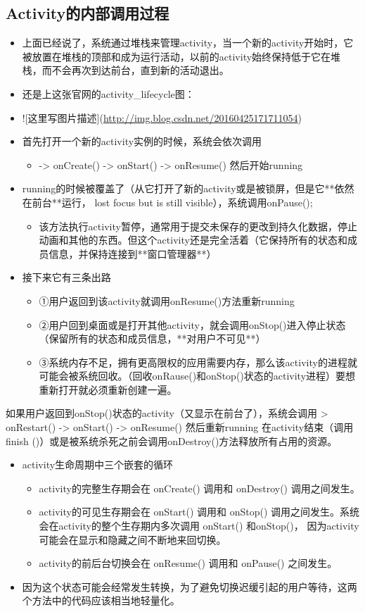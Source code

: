 \documentclass[9pt, b5paper]{article}
\begin{document}
\subsection{Activity的内部调用过程}
\label{sec-1-2}
\begin{itemize}
\item 上面已经说了，系统通过堆栈来管理activity，当一个新的activity开始时，它被放置在堆栈的顶部和成为运行活动，以前的activity始终保持低于它在堆栈，而不会再次到达前台，直到新的活动退出。
\item 还是上这张官网的activity\_lifecycle图：
\item ![这里写图片描述](\url{http://img.blog.csdn.net/20160425171711054})　
\item 首先打开一个新的activity实例的时候，系统会依次调用
\begin{itemize}
\item -> onCreate()  -> onStart() -> onResume() 然后开始running
\end{itemize}
\item running的时候被覆盖了（从它打开了新的activity或是被锁屏，但是它**依然在前台**运行， lost focus but is still visible），系统调用onPause();
\begin{itemize}
\item 该方法执行activity暂停，通常用于提交未保存的更改到持久化数据，停止动画和其他的东西。但这个activity还是完全活着（它保持所有的状态和成员信息，并保持连接到**窗口管理器**）
\end{itemize}
\item 接下来它有三条出路
\begin{itemize}
\item ①用户返回到该activity就调用onResume()方法重新running
\item ②用户回到桌面或是打开其他activity，就会调用onStop()进入停止状态（保留所有的状态和成员信息，**对用户不可见**）
\item ③系统内存不足，拥有更高限权的应用需要内存，那么该activity的进程就可能会被系统回收。（回收onRause()和onStop()状态的activity进程）要想重新打开就必须重新创建一遍。
\end{itemize}
\end{itemize}
如果用户返回到onStop()状态的activity（又显示在前台了），系统会调用
> onRestart() ->  onStart() -> onResume() 然后重新running
在activity结束（调用finish ()）或是被系统杀死之前会调用onDestroy()方法释放所有占用的资源。

\begin{itemize}
\item activity生命周期中三个嵌套的循环
\begin{itemize}
\item activity的完整生存期会在 onCreate() 调用和 onDestroy() 调用之间发生。　
\item activity的可见生存期会在 onStart() 调用和 onStop() 调用之间发生。系统会在activity的整个生存期内多次调用 onStart() 和onStop()， 因为activity可能会在显示和隐藏之间不断地来回切换。　
\item activity的前后台切换会在 onResume() 调用和 onPause() 之间发生。
\end{itemize}
\item 因为这个状态可能会经常发生转换，为了避免切换迟缓引起的用户等待，这两个方法中的代码应该相当地轻量化。
\end{itemize}
\end{document}
